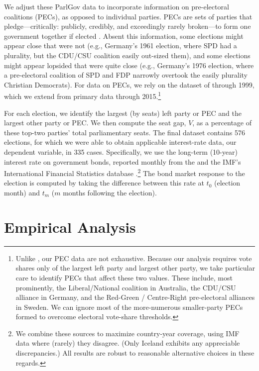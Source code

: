 \documentclass[12pt]{article}
\begin{document}
We adjust these ParlGov data to incorporate information on pre-electoral coalitions (PECs), as opposed to individual parties. PECs are sets of parties that pledge---critically: publicly, credibly, and exceedingly rarely broken---to form one government together if elected \citep{Golder2006}. Absent this information, some elections might appear close that were not (e.g., Germany's 1961 election, where SPD had a plurality, but the CDU/CSU coalition easily out-sized them), and some elections might appear lopsided that were quite close (e.g., Germany's 1976 election, where a pre-electoral coalition of SPD and FDP narrowly overtook the easily plurality Christian Democrats). For data on PECs, we rely on the dataset of \citet{Golder2006} through 1999, which we extend from primary data through 2015.\footnote{Unlike \citet{Golder2006}, our PEC data are not exhaustive. Because our analysis requires vote shares only of the largest left party and largest other party, we take particular care to identify PECs that affect these two values. These include, most prominently, the Liberal/National coalition in Australia, the CDU/CSU alliance in Germany, and the Red-Green / Centre-Right pre-electoral alliances in Sweden. We can ignore most of the more-numerous smaller-party PECs formed to overcome electoral vote-share thresholds.}

For each election, we identify the largest (by seats) left party or PEC and the largest other party or PEC. We then compute the seat gap, $V$, as a percentage of these top-two parties' total parliamentary seats. The final dataset contains 576 elections, for which we were able to obtain applicable interest-rate data, our dependent variable, in 335 cases. Specifically, we use the long-term (10-year) interest rate on government bonds, reported monthly from the \citet{OECD2018} and the IMF's International Financial Statistics database \citep{IMF2018}.\footnote{We combine these sources to maximize country-year coverage, using IMF data where (rarely) they disagree. (Only Iceland exhibits any appreciable discrepancies.) All results are robust to reasonable alternative choices in these regards.} The bond market response to the election is computed by taking the difference between this rate at $t_0$ (election month) and $t_m$ ($m$ months following the election).

\section{Empirical Analysis} \label{section:results}
\end{document}
